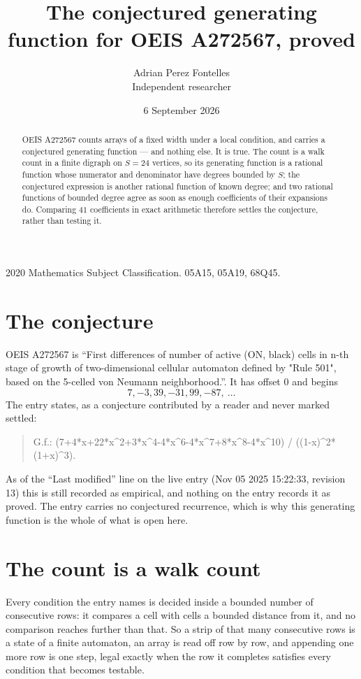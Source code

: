 \documentclass[11pt,a4paper]{article}
\title{The conjectured generating function for OEIS A272567, proved}
\author{Adrian Perez Fontelles\\ \small Independent researcher}
\date{6 September 2026}
\theoremstyle{plain}
\theoremstyle{definition}
\begin{document}
\maketitle

\begin{abstract}
OEIS A272567 counts arrays of a fixed width under a local condition, and carries a conjectured
generating function --- and nothing else. It is true. The count is a walk count in a finite
digraph on $S=24$ vertices, so its generating function is a rational function whose numerator
and denominator have degrees bounded by $S$; the conjectured expression is another rational
function of known degree; and two rational functions of bounded degree agree as soon as enough
coefficients of their expansions do. Comparing $41$ coefficients in exact arithmetic
therefore settles the conjecture, rather than testing it.
\end{abstract}

\noindent\small 2020 Mathematics Subject Classification. 05A15, 05A19, 68Q45.\normalsize

\section{The conjecture}

OEIS A272567 is ``First differences of number of active (ON, black) cells in n-th stage of growth of two-dimensional cellular automaton defined by "Rule 501", based on the 5-celled von Neumann neighborhood.''. It has offset $0$ and begins
\[
7, -3, 39, -31, 99, -87,\ \dots
\]
The entry states, as a conjecture contributed by a reader and never marked settled:
\begin{quote}
G.f.: (7+4*x+22*x\^{}2+3*x\^{}4-4*x\^{}6-4*x\^{}7+8*x\^{}8-4*x\^{}10) / ((1-x)\^{}2*(1+x)\^{}3).
\end{quote}
As of the ``Last modified'' line on the live entry (Nov 05 2025 15:22:33, revision 13) this is still
recorded as empirical, and nothing on the entry records it as proved. The entry carries no
conjectured recurrence, which is why this generating function is the whole of what is open
here.

\section{The count is a walk count}

Every condition the entry names is decided inside a bounded number of consecutive rows: it
compares a cell with cells a bounded distance from it, and no comparison reaches further than
that. So a strip of that many consecutive rows is a state of a finite automaton, an array is
read off row by row, and appending one more row is one step, legal exactly when the row it
completes satisfies every condition that becomes testable.
\end{document}
